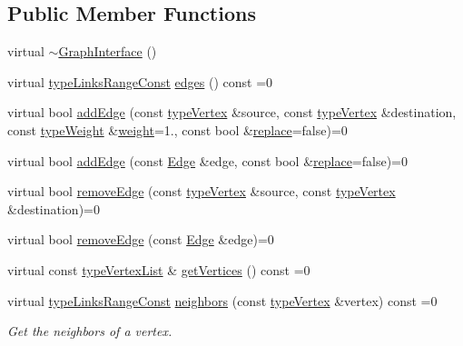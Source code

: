 \subsection*{Public Member Functions}
\begin{DoxyCompactItemize}
\item 
virtual \hyperlink{classGraphInterface_a5f708904a9469c548d85a6788a245340}{$\sim$\+Graph\+Interface} ()
\item 
virtual \hyperlink{graphInterface_8h_ae8d27008f15586bbf419af7ad2e0a48a}{type\+Links\+Range\+Const} \hyperlink{classGraphInterface_a2ac54d73e88516d6793a9a6fc0e434ee}{edges} () const =0
\item 
virtual bool \hyperlink{classGraphInterface_ad72b49c0585d378b7a6488cf07074586}{add\+Edge} (const \hyperlink{edge_8h_a5fbd20c46956d479cb10afc9855223f6}{type\+Vertex} \&source, const \hyperlink{edge_8h_a5fbd20c46956d479cb10afc9855223f6}{type\+Vertex} \&destination, const \hyperlink{edge_8h_a2e7ea3be891ac8b52f749ec73fee6dd2}{type\+Weight} \&\hyperlink{classGraphInterface_a27f350094f566bb4840f22c5bc0695c4}{weight}=1., const bool \&\hyperlink{classGraphInterface_a448a3c66fb5650339f84366257d322ee}{replace}=false)=0
\item 
virtual bool \hyperlink{classGraphInterface_ae77357ec21f272f1e3fb4c93c5f99675}{add\+Edge} (const \hyperlink{classEdge}{Edge} \&edge, const bool \&\hyperlink{classGraphInterface_a448a3c66fb5650339f84366257d322ee}{replace}=false)=0
\item 
virtual bool \hyperlink{classGraphInterface_a1297fd6d7c9698197b5f570f2a9f3701}{remove\+Edge} (const \hyperlink{edge_8h_a5fbd20c46956d479cb10afc9855223f6}{type\+Vertex} \&source, const \hyperlink{edge_8h_a5fbd20c46956d479cb10afc9855223f6}{type\+Vertex} \&destination)=0
\item 
virtual bool \hyperlink{classGraphInterface_a954e2d16f474cce832f02d4495df3092}{remove\+Edge} (const \hyperlink{classEdge}{Edge} \&edge)=0
\item 
virtual const \hyperlink{graphInterface_8h_a21d54d8a139def524d3b0d6f71ec4974}{type\+Vertex\+List} \& \hyperlink{classGraphInterface_a94af429415c22cba42ecf5a97ee6b5c3}{get\+Vertices} () const =0
\item 
virtual \hyperlink{graphInterface_8h_ae8d27008f15586bbf419af7ad2e0a48a}{type\+Links\+Range\+Const} \hyperlink{classGraphInterface_afd5cdff5531b27fca35b58904d757db6}{neighbors} (const \hyperlink{edge_8h_a5fbd20c46956d479cb10afc9855223f6}{type\+Vertex} \&vertex) const =0
\begin{DoxyCompactList}\small\item\em Get the neighbors of a vertex. \end{DoxyCompactList}\item 

\end{DoxyCompactItemize}
